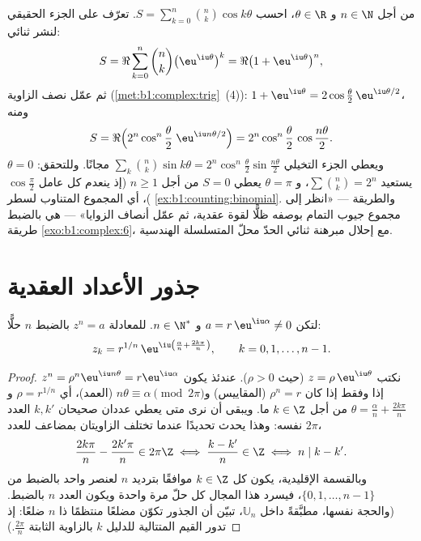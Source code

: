 \begin{example}\label{ex:b1:complex:binomsum}
من أجل $n \in \N$ و $\theta \in \R$، احسب $S =
\sum_{k=0}^{n}\binom nk \cos k\theta$. تعرّف على الجزء الحقيقي
لنشر ثنائي:
\[
S = \Re\sum_{k=0}^n \binom nk \bigl(\eu^{\iu\theta}\bigr)^k
= \Re\bigl(1 + \eu^{\iu\theta}\bigr)^n ,
\]
ثم عمّل نصف الزاوية (\cref{met:b1:complex:trig}~(4)): $1 +
\eu^{\iu\theta} = 2\cos\frac\theta2\,\eu^{\iu\theta/2}$، ومنه
\[
S = \Re\Bigl(2^n\cos^n\frac\theta2\;\eu^{\iu n\theta/2}\Bigr)
= 2^n \cos^n\frac\theta2\,\cos\frac{n\theta}2 .
\]
ويعطي الجزء التخيلي $\sum_k\binom nk\sin k\theta =
2^n\cos^n\frac\theta2\sin\frac{n\theta}2$ مجانًا. وللتحقق:
$\theta = 0$ يستعيد $\sum\binom nk = 2^n$، و $\theta = \pi$
يعطي $S = 0$ من أجل $n \geq 1$ (إذ ينعدم كل عامل $\cos\frac\pi2$)،
أي المجموع المتناوب لسطر
\cref{ex:b1:counting:binomial}. والطريقة --- «انظر إلى مجموع
جيوب التمام بوصفه ظلًّا لقوة عقدية، ثم عمّل أنصاف الزوايا»
--- هي بالضبط طريقة \cref{exo:b1:complex:6}، مع إحلال مبرهنة
ثنائي الحدّ محلّ المتسلسلة الهندسية.
\end{example}

\section{جذور الأعداد العقدية}

\begin{theorem}\label{thm:b1:complex:roots}
لتكن $a = r\,\eu^{\iu\alpha} \neq 0$ و $n \in \N^*$. للمعادلة
$z^n = a$ بالضبط $n$ حلًّا:
\[
z_k = r^{1/n}\, \eu^{\iu\left(\frac{\alpha}{n} +
\frac{2k\pi}{n}\right)},
\qquad k = 0, 1, \dots, n - 1 .
\]
\end{theorem}

\begin{proof}
نكتب $z = \rho\,\eu^{\iu\theta}$ (حيث $\rho > 0$). عندئذ يكون $z^n =
\rho^n \eu^{\iu n\theta} = r \eu^{\iu\alpha}$ إذا وفقط إذا كان $\rho^n
= r$ (المقاييس) و$n\theta \equiv \alpha \pmod{2\pi}$ (العمد)،
أي $\rho = r^{1/n}$ و$\theta = \frac{\alpha}{n} +
\frac{2k\pi}{n}$ من أجل $k \in \Z$ ما. ويبقى أن نرى متى يعطي عددان
صحيحان $k, k'$ العدد نفسه: وهذا يحدث تحديدًا عندما تختلف
الزاويتان بمضاعف للعدد $2\pi$،
\[
\frac{2k\pi}n - \frac{2k'\pi}n \in 2\pi\Z
\iff \frac{k - k'}n \in \Z
\iff n \mid k - k' .
\]
وبالقسمة الإقليدية، يكون كل $k \in \Z$ موافقًا بترديد $n$ لعنصر
واحد بالضبط من $\{0, 1, \dots, n-1\}$، فيسرد هذا المجال
كل حلّ مرة واحدة ويكون العدد $n$ بالضبط. (والحجة نفسها،
مطبَّقةً داخل $\mathbb U_n$، تبيّن أن الجذور تكوّن مضلعًا منتظمًا
ذا $n$ ضلعًا: إذ تدور القيم المتتالية للدليل $k$ بالزاوية الثابتة
$\frac{2\pi}n$.)
\end{proof}

